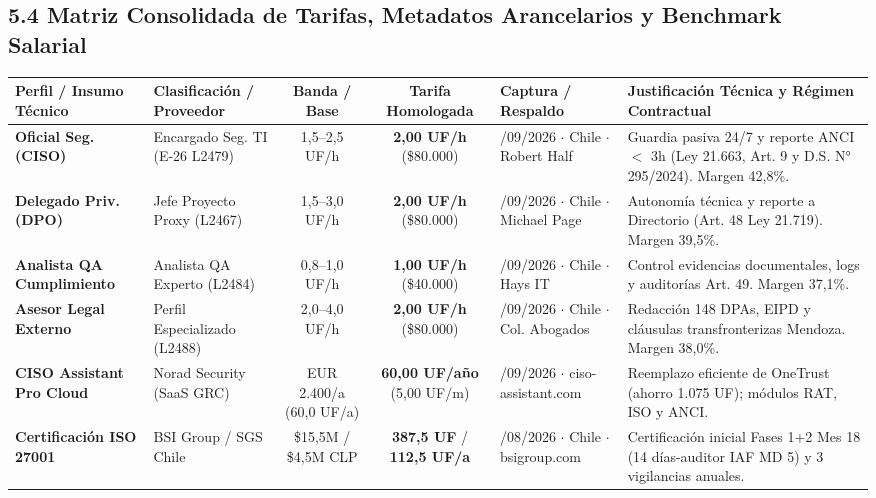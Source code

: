 \documentclass[7.5pt,letterpaper]{article}
\begin{document}
\vspace{-4.5pt}
\subsection*{\scriptsize\color{NavyPrimary}5.4 Matriz Consolidada de Tarifas, Metadatos Arancelarios y Benchmark Salarial}
\vspace{-4.5pt}
\fontsize{5.2pt}{6.2pt}\selectfont
\begin{tabularx}{\textwidth}{@{} >{\raggedright\arraybackslash}p{2.0cm} >{\raggedright\arraybackslash}p{2.0cm} c c >{\raggedright\arraybackslash}p{2.3cm} >{\raggedright\arraybackslash}X @{}}
\toprule
\rowcolor{TableHeadBg}
\textbf{Perfil / Insumo Técnico} & \textbf{Clasificación / Proveedor} & \textbf{Banda / Base} & \textbf{Tarifa Homologada} & \textbf{Captura / Respaldo} & \textbf{Justificación Técnica y Régimen Contractual} \\
\midrule
\textbf{Oficial Seg. (CISO)} & Encargado Seg. TI (E-26 L2479) & 1,5--2,5 UF/h & \textbf{2,00 UF/h} (\$80.000) & 16/09/2026 $\cdot$ Chile $\cdot$ Robert Half & Guardia pasiva 24/7 y reporte ANCI $<$ 3h (Ley 21.663, Art. 9 y D.S. N° 295/2024). Margen 42,8\%. \\
\rowcolor{RowAltBg}
\textbf{Delegado Priv. (DPO)} & Jefe Proyecto Proxy (L2467) & 1,5--3,0 UF/h & \textbf{2,00 UF/h} (\$80.000) & 16/09/2026 $\cdot$ Chile $\cdot$ Michael Page & Autonomía técnica y reporte a Directorio (Art. 48 Ley 21.719). Margen 39,5\%. \\
\textbf{Analista QA Cumplimiento} & Analista QA Experto (L2484) & 0,8--1,0 UF/h & \textbf{1,00 UF/h} (\$40.000) & 16/09/2026 $\cdot$ Chile $\cdot$ Hays IT & Control evidencias documentales, logs y auditorías Art. 49. Margen 37,1\%. \\
\rowcolor{RowAltBg}
\textbf{Asesor Legal Externo} & Perfil Especializado (L2488) & 2,0--4,0 UF/h & \textbf{2,00 UF/h} (\$80.000) & 16/09/2026 $\cdot$ Chile $\cdot$ Col. Abogados & Redacción 148 DPAs, EIPD y cláusulas transfronterizas Mendoza. Margen 38,0\%. \\
\textbf{CISO Assistant Pro Cloud} & Norad Security (SaaS GRC) & EUR 2.400/a (60,0 UF/a) & \textbf{60,00 UF/año} (5,00 UF/m) & 16/09/2026 $\cdot$ ciso-assistant.com & Reemplazo eficiente de OneTrust (ahorro 1.075 UF); módulos RAT, ISO y ANCI. \\
\rowcolor{RowAltBg}
\textbf{Certificación ISO 27001} & BSI Group / SGS Chile & \$15,5M / \$4,5M CLP & \textbf{387,5 UF} / \textbf{112,5 UF/a} & 28/08/2026 $\cdot$ Chile $\cdot$ bsigroup.com & Certificación inicial Fases 1+2 Mes 18 (14 días-auditor IAF MD 5) y 3 vigilancias anuales. \\

\end{tabularx}
\end{document}
